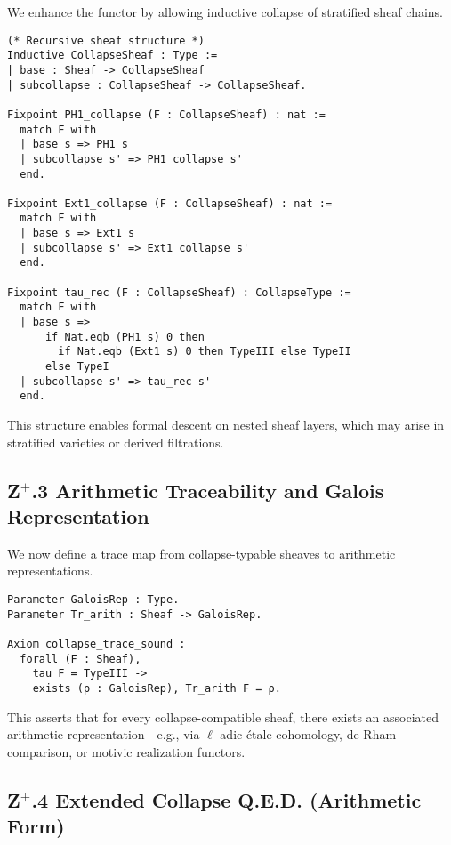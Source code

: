 \documentclass[11pt]{article}
\begin{document}
We enhance the functor by allowing inductive collapse of stratified sheaf chains.

\begin{lstlisting}[language=Coq, caption={Recursive Collapse Definition in Coq}]
(* Recursive sheaf structure *)
Inductive CollapseSheaf : Type :=
| base : Sheaf -> CollapseSheaf
| subcollapse : CollapseSheaf -> CollapseSheaf.

Fixpoint PH1_collapse (F : CollapseSheaf) : nat :=
  match F with
  | base s => PH1 s
  | subcollapse s' => PH1_collapse s'
  end.

Fixpoint Ext1_collapse (F : CollapseSheaf) : nat :=
  match F with
  | base s => Ext1 s
  | subcollapse s' => Ext1_collapse s'
  end.

Fixpoint tau_rec (F : CollapseSheaf) : CollapseType :=
  match F with
  | base s =>
      if Nat.eqb (PH1 s) 0 then
        if Nat.eqb (Ext1 s) 0 then TypeIII else TypeII
      else TypeI
  | subcollapse s' => tau_rec s'
  end.
\end{lstlisting}

This structure enables formal descent on nested sheaf layers, which may arise in stratified varieties or derived filtrations.

\subsection*{Z$^+$.3 Arithmetic Traceability and Galois Representation}

We now define a trace map from collapse-typable sheaves to arithmetic representations.

\begin{lstlisting}[language=Coq, caption={Arithmetic Trace Functor}]
Parameter GaloisRep : Type.
Parameter Tr_arith : Sheaf -> GaloisRep.

Axiom collapse_trace_sound :
  forall (F : Sheaf),
    tau F = TypeIII ->
    exists (ρ : GaloisRep), Tr_arith F = ρ.
\end{lstlisting}

This asserts that for every collapse-compatible sheaf, there exists an associated arithmetic representation—e.g., via $\ell$-adic étale cohomology, de Rham comparison, or motivic realization functors.

\subsection*{Z$^+$.4 Extended Collapse Q.E.D. (Arithmetic Form)}
\end{document}
